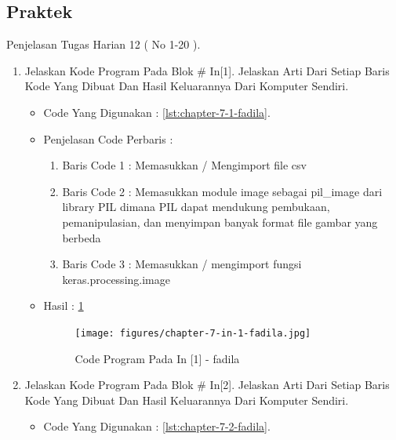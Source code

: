 \subsection{Praktek}
Penjelasan Tugas Harian 12 ( No 1-20 ).
\begin{enumerate}
\item Jelaskan Kode Program Pada Blok \# In[1]. Jelaskan Arti Dari Setiap Baris Kode Yang Dibuat Dan Hasil Keluarannya Dari Komputer Sendiri.
\begin{itemize}
\item Code Yang Digunakan : \ref{lst:chapter-7-1-fadila}.

\par
\par
\item Penjelasan Code Perbaris	: 
\begin{enumerate}
\item Baris Code 1	: Memasukkan / Mengimport file csv
\item Baris Code 2	: Memasukkan module image sebagai pil\_image dari library PIL dimana PIL dapat mendukung pembukaan, pemanipulasian, dan menyimpan banyak format file gambar yang berbeda
\item Baris Code 3	: Memasukkan / mengimport fungsi keras.processing.image 
\end{enumerate}
\par
\item Hasil : \ref{chapter-7-in-1-fadila}
\par
\par
\begin{figure}[!hbtp]
\centering
\texttt{[image: figures/chapter-7-in-1-fadila.jpg]}
\caption{Code Program Pada In [1] - fadila}
\label{chapter-7-in-1-fadila}
\end{figure}
\par
\par
\end{itemize}
\par
\par
\par
\item Jelaskan Kode Program Pada Blok \# In[2]. Jelaskan Arti Dari Setiap Baris Kode Yang Dibuat Dan Hasil Keluarannya Dari Komputer Sendiri.
\begin{itemize}
\item Code Yang Digunakan : \ref{lst:chapter-7-2-fadila}.


\end{itemize}
\end{enumerate}

